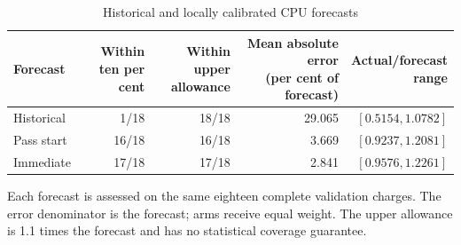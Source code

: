 \documentclass[11pt]{article}
\begin{document}
\begin{table}[htbp]
\centering\small
\caption{Historical and locally calibrated CPU forecasts}\label{tab:cpu-prediction}
\setlength{\tabcolsep}{4pt}
\begin{tabular}{lrrrr}
\toprule
Forecast & \shortstack{Within\\ten per cent} & \shortstack{Within upper\\allowance} & \shortstack{Mean absolute error\\(per cent of forecast)} & \shortstack{Actual/forecast\\range} \\
\midrule
Historical & 1/18 & 18/18 & 29.065 & $[0.5154,1.0782]$ \\
Pass start & 16/18 & 16/18 & 3.669 & $[0.9237,1.2081]$ \\
Immediate & 17/18 & 17/18 & 2.841 & $[0.9576,1.2261]$ \\
\bottomrule
\end{tabular}
\par\smallskip\begin{minipage}{\textwidth}\footnotesize Each forecast is assessed on the same eighteen complete validation charges. The error denominator is the forecast; arms receive equal weight. The upper allowance is 1.1 times the forecast and has no statistical coverage guarantee.\end{minipage}
\end{table}
\end{document}
